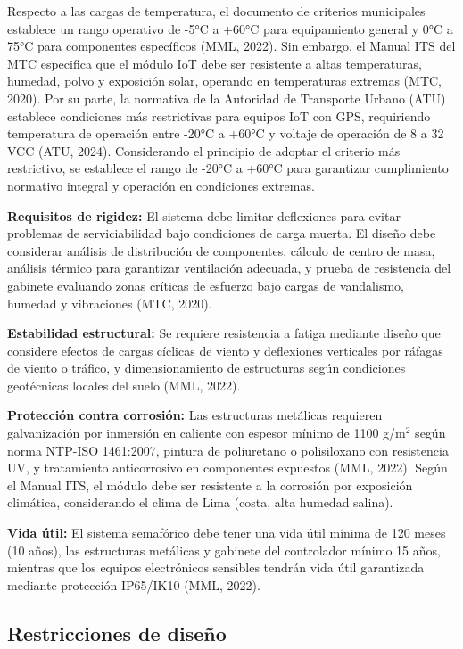 \documentclass[12pt,a4paper,oneside]{report}
\begin{document}
Respecto a las cargas de temperatura, el documento de criterios municipales establece un rango operativo de -5°C a +60°C para equipamiento general y 0°C a 75°C para componentes específicos (MML, 2022). Sin embargo, el Manual ITS del MTC especifica que el módulo IoT debe ser resistente a altas temperaturas, humedad, polvo y exposición solar, operando en temperaturas extremas (MTC, 2020). Por su parte, la normativa de la Autoridad de Transporte Urbano (ATU) establece condiciones más restrictivas para equipos IoT con GPS, requiriendo temperatura de operación entre -20°C a +60°C y voltaje de operación de 8 a 32 VCC (ATU, 2024). Considerando el principio de adoptar el criterio más restrictivo, se establece el rango de -20°C a +60°C para garantizar cumplimiento normativo integral y operación en condiciones extremas.

\textbf{Requisitos de rigidez:} El sistema debe limitar deflexiones para evitar problemas de serviciabilidad bajo condiciones de carga muerta. El diseño debe considerar análisis de distribución de componentes, cálculo de centro de masa, análisis térmico para garantizar ventilación adecuada, y prueba de resistencia del gabinete evaluando zonas críticas de esfuerzo bajo cargas de vandalismo, humedad y vibraciones (MTC, 2020).

\textbf{Estabilidad estructural:} Se requiere resistencia a fatiga mediante diseño que considere efectos de cargas cíclicas de viento y deflexiones verticales por ráfagas de viento o tráfico, y dimensionamiento de estructuras según condiciones geotécnicas locales del suelo (MML, 2022).

\textbf{Protección contra corrosión:} Las estructuras metálicas requieren galvanización por inmersión en caliente con espesor mínimo de 1100 g/m\ensuremath{^{2}} según norma NTP-ISO 1461:2007, pintura de poliuretano o polisiloxano con resistencia UV, y tratamiento anticorrosivo en componentes expuestos (MML, 2022). Según el Manual ITS, el módulo debe ser resistente a la corrosión por exposición climática, considerando el clima de Lima (costa, alta humedad salina).

\textbf{Vida útil:} El sistema semafórico debe tener una vida útil mínima de 120 meses (10 años), las estructuras metálicas y gabinete del controlador mínimo 15 años, mientras que los equipos electrónicos sensibles tendrán vida útil garantizada mediante protección IP65/IK10 (MML, 2022).

\subsection{Restricciones de diseño}\label{restricciones-de-diseuxf1o}
\end{document}
